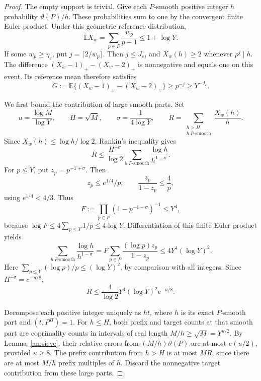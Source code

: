 \begin{proof}
The empty support is trivial. Give each \(P\)-smooth positive integer
\(h\) probability \(\vartheta(P)/h\). These probabilities sum to one
by the convergent finite Euler product. Under this geometric reference
distribution,
\begin{equation}
 \mathbb E X_w=\sum_{p\in P}\frac{w_p}{p-1}\le1+\log Y.
 \label{an:model-mean}
\end{equation}
If some \(w_p\ge\eta_\varepsilon\), put \(j=\lceil2/w_p\rceil\).
Then \(j\le J_\varepsilon\), and \(X_w(h)\ge2\) whenever
\(p^j\mid h\). The difference
\((X_w-1)_+-(X_w-2)_+\) is nonnegative and equals one on this event.
Its reference mean therefore satisfies
\begin{equation}
 G:=\mathbb E\{(X_w-1)_+-(X_w-2)_+\}
 \ge p^{-j}\ge Y^{-J_\varepsilon}.
 \label{an:model-gap}
\end{equation}

We first bound the contribution of large smooth parts. Set
\[
 u=\frac{\log M}{\log Y},\qquad H=\sqrt M,\qquad
 \sigma=\frac1{4\log Y},\qquad
 R=\sum_{\substack{h>H\\h\ P\text{-smooth}}}\frac{X_w(h)}h.
\]
Since \(X_w(h)\le\log h/\log2\), Rankin's inequality gives
\begin{equation}
 R\le\frac{H^{-\sigma}}{\log2}
 \sum_{h\ P\text{-smooth}}\frac{\log h}{h^{1-\sigma}}.
 \label{an:rankin-start}
\end{equation}
For \(p\le Y\), put \(z_p=p^{-1+\sigma}\). Then
\[
 z_p\le e^{1/4}/p,
 \qquad \frac{z_p}{1-z_p}\le\frac4p,
\]
using \(e^{1/4}<4/3\). Thus
\[
 F:=\prod_{p\in P}(1-p^{-1+\sigma})^{-1}\le Y^4,
\]
because \(\log F\le4\sum_{p\le Y}1/p\le4\log Y\).
Differentiation of this finite Euler product yields
\[
 \sum_{h\ P\text{-smooth}}\frac{\log h}{h^{1-\sigma}}
 =F\sum_{p\in P}\frac{(\log p)z_p}{1-z_p}
 \le4Y^4(\log Y)^2.
\]
Here \(\sum_{p\le Y}(\log p)/p\le(\log Y)^2\), by comparison with
all integers. Since \(H^{-\sigma}=e^{-u/8}\),
\begin{equation}
 R\le\frac4{\log2}Y^4(\log Y)^2e^{-u/8}.
 \label{an:rankin-tail}
\end{equation}

Decompose each positive integer uniquely as \(ht\), where \(h\) is
its exact \(P\)-smooth part and \((t,P^{\Pi})=1\). For \(h\le H\),
both prefix and target counts at that smooth part are coprimality
counts in intervals of real length \(M/h\ge\sqrt M=Y^{u/2}\).
By Lemma~\ref{an:sieve}, their relative errors from
\((M/h)\vartheta(P)\) are at most \(e(u/2)\), provided \(u\ge8\).
The prefix contribution from \(h>H\) is at most \(MR\), since there
are at most \(M/h\) prefix multiples of \(h\). Discard the
nonnegative target contribution from these large parts.


\end{proof}
